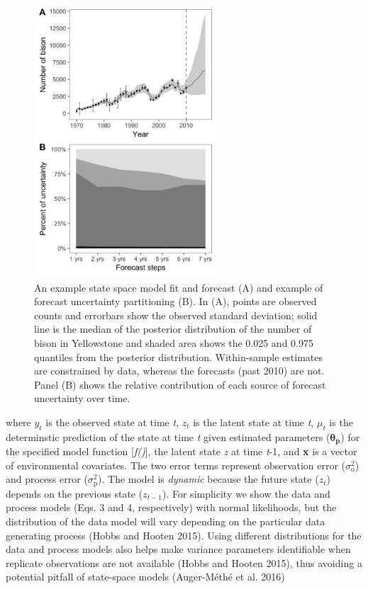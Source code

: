 \documentclass[12pt,]{article}
\begin{document}
\begin{figure}
  \centering
     \includegraphics[height=4in]{../figures/bison_combined.png}
  \caption{An example state space model fit and forecast (A) and example of forecast uncertainty partitioning (B). In (A), points are observed counts and errorbars show the observed standard deviation; solid line is the median of the posterior distribution of the number of bison in Yellowstone and shaded area shows the 0.025 and 0.975 quantiles from the posterior distribution. Within-sample estimates are constrained by data, whereas the forecasts (past 2010) are not. Panel (B) shows the relative contribution of each source of forecast uncertainty over time.}
\end{figure}

where \(y_t\) is the observed state at time \emph{t}, \(z_t\) is the
latent state at time \emph{t}, \(\mu_t\) is the determinstic prediction
of the state at time \emph{t} given estimated parameters
(\(\boldsymbol{\theta_p}\)) for the specified model function
{[}\emph{f()}{]}, the latent state \emph{z} at time \emph{t}-1, and
\textbf{x} is a vector of environmental covariates. The two error terms
represent observation error (\(\sigma^2_{\text{o}}\)) and process error
(\(\sigma^2_{\text{p}}\)). The model is \emph{dynamic} because the
future state (\(z_t\)) depends on the previous state (\(z_{t-1}\)). For
simplicity we show the data and process models (Eqs. 3 and 4,
respectively) with normal likelihoods, but the distribution of the data
model will vary depending on the particular data generating process
(Hobbs and Hooten 2015). Using different distributions for the data and
process models also helps make variance parameters identifiable when
replicate observations are not available (Hobbs and Hooten 2015), thus
avoiding a potential pitfall of state-space models (Auger-Méthé et al.
2016)
\end{document}
